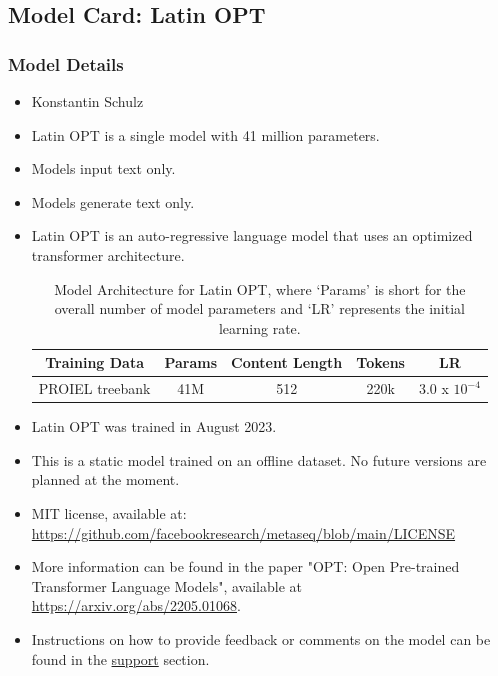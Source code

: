 \subsection{Model Card: Latin OPT}
\subsubsection{Model Details}
\begin{itemize}[font=\bfseries]
    \item[Model Developer] Konstantin Schulz
    \item[Variations] Latin OPT is a single model with 41 million parameters.
    \item[Input] Models input text only.
    \item[Output] Models generate text only. 
    \item[Model Architecture] Latin OPT is an auto-regressive language model that uses an optimized transformer architecture. \\
    \begin{table}[H]
        \centering
        \begin{tabular}{c|c|c|c|c}
        Training Data & Params & Content Length & Tokens & LR \\ \hline
        PROIEL treebank & 41M & 512 & 220k & 3.0 x $10^{-4}$
        \end{tabular}
        \caption{Model Architecture for Latin OPT, where `Params' is short for the overall number of model parameters and `LR' represents the initial learning rate.}
        \label{tab:latin_opt_architecture}
    \end{table}
    \item[Model Dates] Latin OPT was trained in August 2023.
    \item[Status] This is a static model trained on an offline dataset. No future versions are planned at the moment.
    \item[License] MIT license, available at: \url{https://github.com/facebookresearch/metaseq/blob/main/LICENSE}
    \item[Research Paper] More information can be found in the paper "OPT: Open Pre-trained Transformer Language Models", available at \url{https://arxiv.org/abs/2205.01068}.
    \item[Questions or comments] Instructions on how to provide feedback or comments on the model can be found in the \href{https://github.com/facebookresearch/metaseq#support}{support} section. 
\end{itemize}
